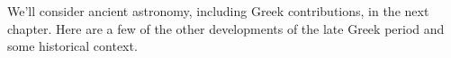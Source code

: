 % 


\label{pg:eratosthenes}

We'll consider ancient astronomy, including Greek contributions, in the next chapter. Here are a few of the other developments of the late Greek period and some historical context.

